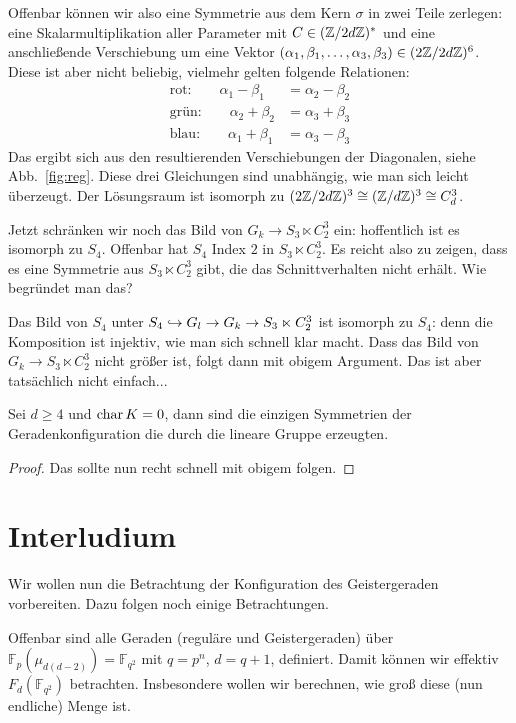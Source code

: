 Offenbar können wir also eine Symmetrie aus dem Kern $\sigma$ in zwei Teile zerlegen: eine Skalarmultiplikation aller Parameter mit $C \in (\Zmod 2dZ)^*$ und eine anschließende Verschiebung um eine Vektor $(\alpha_1, \beta_1, \dots, \alpha_3, \beta_3) \in (2\Zmod 2dZ)^6$. Diese ist aber nicht beliebig, vielmehr gelten folgende Relationen:
\begin{align*}
\text{rot:}\qquad  \alpha_1 - \beta_1 &= \alpha_2 - \beta_2 \\
\text{grün:}\qquad \alpha_2 + \beta_2 &= \alpha_3 + \beta_3 \\
\text{blau:}\qquad \alpha_1 + \beta_1 &= \alpha_3 - \beta_3
\end{align*}
Das ergibt sich aus den resultierenden Verschiebungen der Diagonalen, siehe Abb.~\ref{fig:reg}. Diese drei Gleichungen sind unabhängig, wie man sich leicht überzeugt. Der Lösungsraum ist isomorph zu $(2\Zmod 2dZ)^3 \cong (\Zmod dZ)^3 \cong C_d^3$.

Jetzt schränken wir noch das Bild von $G_k \to S_3 \ltimes C_2^3$ ein: hoffentlich ist es isomorph zu $S_4$. Offenbar hat $S_4$ Index $2$ in $S_3 \ltimes C_2^3$. Es reicht also zu zeigen, dass es eine Symmetrie aus $S_3 \ltimes C_2^3$ gibt, die das Schnittverhalten nicht erhält. \note Wie begründet man das?

Das Bild von $S_4$ unter $S_4 \hookrightarrow G_l \rightarrow G_k \rightarrow S_3 \ltimes C_2^3$ ist isomorph zu $S_4$: denn die Komposition ist injektiv, wie man sich schnell klar macht. Dass das Bild von $G_k \to S_3 \ltimes C_2^3$ nicht größer ist, folgt dann mit obigem Argument. Das ist aber tatsächlich nicht einfach...

\begin{theorem}
Sei $d \geq 4$ und $\operatorname{char} K=0$, dann sind die einzigen Symmetrien der Geradenkonfiguration die durch die lineare Gruppe erzeugten.
\end{theorem}
\begin{proof}
Das sollte nun recht schnell mit obigem folgen.
\end{proof}

\section{Interludium}
Wir wollen nun die Betrachtung der Konfiguration des Geistergeraden vorbereiten. Dazu folgen noch einige Betrachtungen.

Offenbar sind alle Geraden (reguläre und Geistergeraden) über $\mathbb F_p(\mu_{d(d-2)}) = \mathbb F_{q^2}$ mit $q = p^n$, $d = q+1$, definiert. Damit können wir effektiv $F_d(\mathbb F_{q^2})$ betrachten. Insbesondere wollen wir berechnen, wie groß diese (nun endliche) Menge ist.

